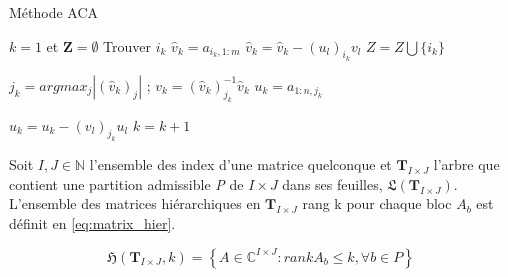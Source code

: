 \begin{algorithm}
\caption{Méthode ACA}\label{alg:aca_method}
\begin{algorithmic}[1]
\State $k=1$ et $\mathbf{Z} = \emptyset $
\Repeat
\State Trouver $i_{k}$
\State $\hat{v}_{k} = a_{i_{k},1:m} $
\State $\hat{v}_{k} = \hat{v}_{k} - (u_{l})_{i_{k}}v_{l} $
\EndFor
\State $Z = Z \bigcup \{ i_{k} \} $

\State $j_{k} = argmax_{j}|(\hat{v}_{k})_{j}|$ ; $v_{k} = (\hat{v}_{k})^{-1}_{j_{k}} \hat{v}_{k}$
\State $u_{k}=a_{1:n,j_{k}}$

\State $u_{k}=u_{k} - (v_{l})_{j_{k}}u_{l}$
\EndFor
\State $k=k+1$

\EndIf



\end{algorithmic}
\end{algorithm}

Soit $I,J \in \mathbb{N}$ l'ensemble des index d'une matrice quelconque et $\mathbf{T}_{I \times J}$ l'arbre que contient une partition admissible \textit{P} de $ I \times J$ dans ses feuilles, $\mathfrak{L}(\mathbf{T}_{I \times J})$. L'ensemble des matrices hiérarchiques en $\mathbf{T}_{I \times J}$ rang k pour chaque bloc $A_{b}$ est définit en \ref{eq:matrix_hier}.

\begin{equation}\label{eq:matrix_hier}
    \mathfrak{H}(\mathbf{T}_{I \times J},k) = \left\{  A\in \mathbb{C}^{I\times J} : rankA_{b} \leq k, \forall b \in P \right\}
\end{equation}

